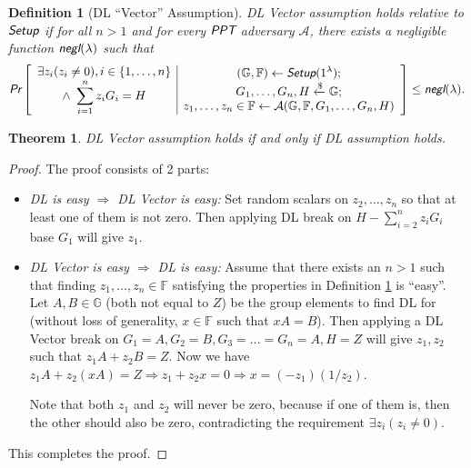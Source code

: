 \documentclass{article}
\newtheorem{definition}{Definition}[section]
\newtheorem{theorem}{Theorem}[section]
\begin{document}
\begin{definition}[DL ``Vector'' Assumption]\label{vector}
DL Vector assumption holds relative to $\emph{\textsf{Setup}}$ if for all $n>1$ and for every $\emph{\textsf{PPT}}$ adversary $\mathcal{A}$, there exists a negligible function $\emph{\textsf{negl}}(\lambda)$ such that
\begin{align*}
\emph{\textsf{Pr}}\left[
\begin{array}{c|c}
    \begin{gathered}
        \exists z_i(z_i \neq 0), i\in\{1, \ldots, n\} \\
        \wedge\ \sum_{i=1}^{n}{z_i G_i}=H
    \end{gathered}
    &
    \begin{gathered}
        (\mathbb{G}, \mathbb{F})\leftarrow\emph{\textsf{Setup}}(1^{\lambda}); \\
        G_1,\ldots, G_n, H\xleftarrow{\$}\mathbb{G}; \\
        z_1, \ldots, z_n\in\mathbb{F}\leftarrow\mathcal{A}(\mathbb{G}, \mathbb{F}, G_1, \ldots, G_n, H) \\
    \end{gathered}
\end{array}
\right]
\le \emph{\textsf{negl}}(\lambda).
\end{align*}
\end{definition}

\begin{theorem}
DL Vector assumption holds if and only if DL assumption holds.
\end{theorem}
\begin{proof}
The proof consists of 2 parts:
\begin{itemize}
    \item \textit{DL is easy $\Rightarrow$ DL Vector is easy:} Set random scalars on $z_2,\ldots,z_n$ so that at least one of them is not zero. Then applying DL break on $H - \sum_{i=2}^{n}{z_i G_i}$ base $G_1$ will give $z_1$.
    \item \textit{DL Vector is easy $\Rightarrow$ DL is easy:} Assume that there exists an $n>1$ such that finding $z_1,\ldots,z_n\in\mathbb{F}$ satisfying the properties in Definition \ref{vector} is ``easy''. Let $A, B\in\mathbb{G}$ (both not equal to $Z$) be the group elements to find DL for (without loss of generality, $x\in\mathbb{F}$ such that $xA=B$). Then applying a DL Vector break on $G_1=A, G_2=B, G_3=\ldots=G_n=A, H=Z$ will give $z_1, z_2$ such that $z_1 A + z_2 B = Z$. Now we have $z_1 A + z_2 (xA) = Z \Rightarrow z_1 + z_2 x = 0 \Rightarrow x = (-z_1)(1/z_2)$.

Note that both $z_1$ and $z_2$ will never be zero, because if one of them is, then the other should also be zero, contradicting the requirement $\exists z_i(z_i \neq 0)$.
\end{itemize}
This completes the proof.
\end{proof}

%
%
\end{document}

